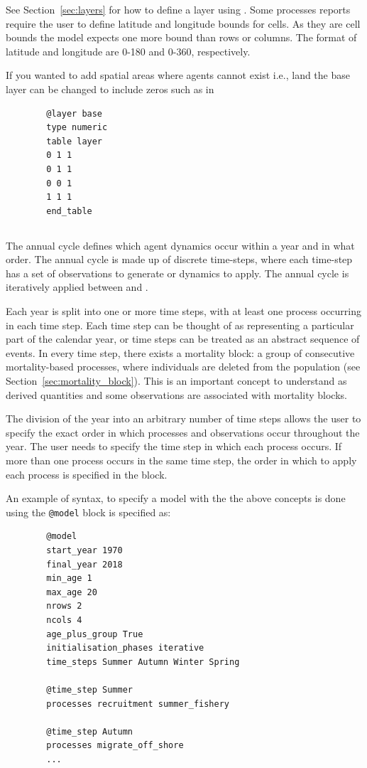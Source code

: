 See Section~\ref{sec:layers} for how to define a layer using . Some processes reports require the user to define latitude and longitude bounds for cells. As they are cell bounds the model expects one more bound than rows or columns. The format of latitude and longitude are 0-180 and 0-360, respectively.

If you wanted to add spatial areas where agents cannot exist i.e., land the base layer can be changed to include zeros such as in
{\small{\begin{verbatim}
		@layer base
		type numeric
		table layer
		0 1 1 
		0 1 1
		0 0 1
		1 1 1 
		end_table		
		\end{verbatim}}}



\subsection{}\label{sub:sec:annualcylc}
The annual cycle defines which agent dynamics occur within a year and in what order. The annual cycle is made up of discrete time-steps, where each time-step has a set of observations to generate or dynamics to apply. The annual cycle is iteratively applied between  and .

Each year is split into one or more time steps, with at least one process occurring in each time step. Each time step can be thought of as representing a particular part of the calendar year, or time steps can be treated as an abstract sequence of events. In every time step, there exists a mortality block: a group of consecutive mortality-based processes, where individuals are deleted from the population (see Section~\ref{sec:mortality_block}). This is an important concept to understand as derived quantities and some observations are associated with mortality blocks.

The division of the year into an arbitrary number of time steps allows the user to specify the exact order in which processes and observations occur throughout the year. The user needs to specify the time step in which each process occurs. If more than one process occurs in the same time step, the order in which to apply each process is specified in the  block.


An example of syntax, to specify a model with the the above concepts is done using the \texttt{@model} block is specified as:
{\small{\begin{verbatim}
		@model
		start_year 1970
		final_year 2018
		min_age 1
		max_age 20
		nrows 2
		ncols 4
		age_plus_group True
		initialisation_phases iterative
		time_steps Summer Autumn Winter Spring
		
		@time_step Summer
		processes recruitment summer_fishery 

		@time_step Autumn
		processes migrate_off_shore
		...
\end{verbatim}}}


